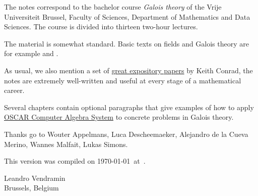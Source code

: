 \preface

The notes correspond to the bachelor 
course \emph{Galois theory} of the 
Vrije Universiteit Brussel, 
Faculty of Sciences, 
Department of Mathematics and Data Sciences. The course
is divided into thirteen two-hour lectures. 

The material is somewhat standard. Basic texts on fields and Galois theory 
are for example \cite{MR1645586} and 
\cite{MR3379917}. 

As usual, we also mention a set of 
\href{https://kconrad.math.uconn.edu/blurbs/}{great expository papers} by 
Keith Conrad, the notes are extremely well-written and useful  
at every stage of a mathematical career. 

Several chapters contain optional paragraphs that give examples of 
how to apply \href{https://oscar.computeralgebra.de/}{OSCAR Computer Algebra System}
to concrete problems in Galois theory. 

 
Thanks go to Wouter Appelmans, Luca Descheemaeker, 
Alejandro de la Cueva Merino, 
Wannes Malfait,
Lukas Simons. 


This version 
was compiled on \today~at~\currenttime.

\bigskip
\begin{flushright}
Leandro Vendramin\\Brussels, Belgium\par
\end{flushright}

